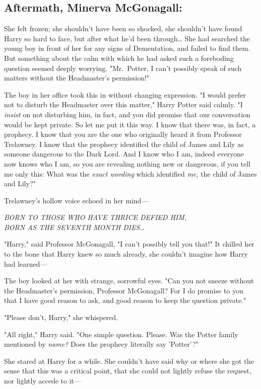 \subsection{Aftermath, Minerva McGonagall:}

She felt frozen; she shouldn't have been so shocked, she shouldn't have found 
Harry so hard to face, but after what he'd been through{\ldots} She had 
searched the young boy in front of her for any signs of Dementation, and failed 
to find them. But something about the calm with which he had asked such a 
foreboding question seemed deeply worrying. "Mr.~Potter, I can't possibly speak 
of such matters without the Headmaster's permission!"

The boy in her office took this in without changing expression. "I would prefer 
not to disturb the Headmaster over this matter," Harry Potter said calmly. "I 
\emph{insist} on not disturbing him, in fact, and you did promise that our 
conversation would be kept private. So let me put it this way. I know that 
there was, in fact, a prophecy. I know that you are the one who originally 
heard it from Professor Trelawney. I know that the prophecy identified the 
child of James and Lily as someone dangerous to the Dark Lord. And I know who I 
am, indeed everyone now knows who I am, so you are revealing nothing new or 
dangerous, if you tell me only this: What was the \emph{exact wording} which 
identified \emph{me,} the child of James and Lily?"

Trelawney's hollow voice echoed in her mind---

\emph{BORN TO THOSE WHO HAVE THRICE DEFIED HIM,\\
BORN AS THE SEVENTH MONTH DIES{\ldots}}

"Harry," said Professor McGonagall, "I can't possibly tell you that!" It 
chilled her to the bone that Harry knew so much already, she couldn't imagine 
how Harry had learned---

The boy looked at her with strange, sorrowful eyes. "Can you not sneeze without 
the Headmaster's permission, Professor McGonagall? For I do promise to you that 
I have good reason to ask, and good reason to keep the question private."

"Please don't, Harry," she whispered.

"All right," Harry said. "One simple question. Please. Was the Potter family 
mentioned by \emph{name?} Does the prophecy literally say 'Potter'?"

She stared at Harry for a while. She couldn't have said why or where she got 
the sense that this was a critical point, that she could not lightly refuse the 
request, nor lightly accede to it---

